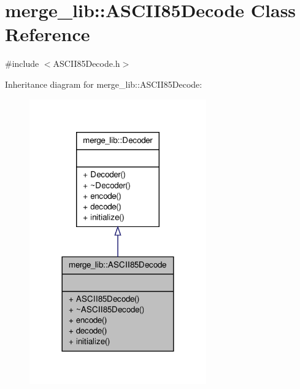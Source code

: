 \hypertarget{classmerge__lib_1_1_a_s_c_i_i85_decode}{\section{merge\-\_\-lib\-:\-:A\-S\-C\-I\-I85\-Decode Class Reference}
\label{d3/d7a/classmerge__lib_1_1_a_s_c_i_i85_decode}
}


{\ttfamily \#include $<$A\-S\-C\-I\-I85\-Decode.\-h$>$}



Inheritance diagram for merge\-\_\-lib\-:\-:A\-S\-C\-I\-I85\-Decode\-:
\nopagebreak
\begin{figure}[H]
\begin{center}
\leavevmode
\includegraphics[width=216pt]{d5/d65/classmerge__lib_1_1_a_s_c_i_i85_decode__inherit__graph}
\end{center}
\end{figure}


